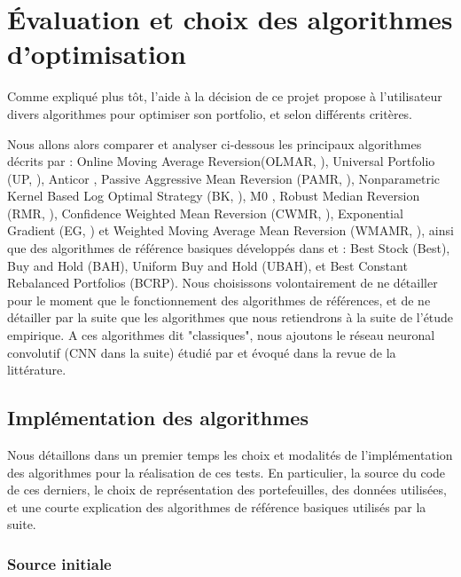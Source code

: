 \documentclass[a4paper, 10pt]{article}
\begin{document}
\newpage
\section{Évaluation et choix des algorithmes d'optimisation}
\label{sec:theorie}

Comme expliqué plus tôt, l'aide à la décision de ce projet propose à l'utilisateur divers algorithmes pour optimiser son portfolio, et selon différents critères. 

 Nous allons alors comparer et analyser ci-dessous les principaux algorithmes décrits par \citet{Li2014} : Online Moving Average Reversion(OLMAR, \cite{Li2015}), Universal Portfolio (UP, \cite{Cover1991}), Anticor \cite{Borodin2004}, Passive Aggressive Mean Reversion (PAMR, \cite{Li2012}), Nonparametric Kernel Based Log Optimal Strategy (BK, \cite{Gyorfi2006}), M0 \cite{Borodin2000}, Robust Median Reversion (RMR, \cite{Huang2013}), Confidence Weighted Mean Reversion (CWMR, \cite{Li2013}), Exponential Gradient (EG, \cite{Helmbold1998}) et Weighted Moving Average Mean Reversion (WMAMR, \cite{Gao2013}), ainsi que des algorithmes de référence basiques développés dans \cite{Cover1991} et \cite{Cover1986} : Best Stock (Best), Buy and Hold (BAH), Uniform Buy and Hold (UBAH), et Best Constant Rebalanced Portfolios (BCRP). Nous choisissons volontairement de ne détailler pour le moment que le fonctionnement des algorithmes de références, et de ne détailler par la suite que les algorithmes que nous retiendrons à la suite de l'étude empirique. A ces algorithmes dit "classiques", nous ajoutons le réseau neuronal convolutif (CNN dans la suite) étudié par \citet{Jiang2017} et évoqué dans la revue de la littérature.

\subsection{Implémentation des algorithmes}
\label{sec:theorie_implem}

Nous détaillons dans un premier temps les choix et modalités de l'implémentation des algorithmes pour la réalisation de ces tests. En particulier, la source du code de ces derniers, le choix de représentation des portefeuilles, des données utilisées, et une courte explication des algorithmes de référence basiques utilisés par la suite.

\subsubsection{Source initiale}
\label{sec:theorie_implem_source}
\end{document}
